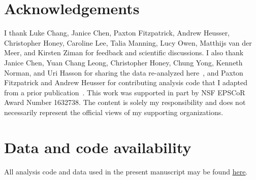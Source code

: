 \documentclass{article}
\begin{document}
\section*{Acknowledgements}
I thank Luke Chang, Janice Chen, Paxton Fitzpatrick, Andrew Heusser, Christopher Honey, Caroline Lee, Talia Manning, Lucy Owen, Matthijs van der Meer, and Kirsten Ziman for feedback and scientific discussions. I also thank Janice Chen, Yuan Chang Leong, Christopher Honey, Chung Yong, Kenneth Norman, and Uri Hasson for sharing the data re-analyzed here~\citep{ChenEtal17}, and Paxton Fitzpatrick and Andrew Heusser for contributing analysis code that I adapted from a prior publication~\citep{HeusEtal18c}.  This work was supported in part by NSF EPSCoR Award Number 1632738. The content is solely my responsibility and does not necessarily represent the official views of my supporting organizations.

\section*{Data and code availability}
All analysis code and data used in the present manuscript may be found \href{https://github.com/ContextLab/mental-time-travel-paper}{\underline{here}}.



\end{document}
